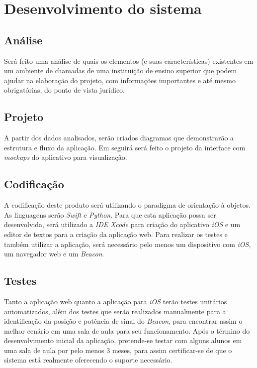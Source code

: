 \documentclass[
	12pt,
	oneside,
	a4paper,
	english,
	brazil,
]{abntex2}
\begin{document}
\section{Desenvolvimento do sistema}
\subsection{Análise}

Será feito uma análise de quais os elementos (e suas características) existentes em um ambiente de chamadas de uma instituição de ensino superior que podem ajudar na elaboração do projeto, com informações importantes e até mesmo obrigatórias, do ponto de vista jurídico.

\subsection{Projeto}

A partir dos dados analisados, serão criados diagramas que demonstrarão a estrutura e fluxo da aplicação. Em seguirá será feito o projeto da interface com \emph{mockups} do aplicativo para visualização.

\subsection{Codificação}

A codificação deste produto será utilizando o paradigma de orientação à objetos. As linguagens serão \emph{Swift} e \emph{Python}. Para que esta aplicação possa ser desenvolvida, será utilizado a \emph{IDE} \emph{Xcode} para criação do aplicativo \emph{iOS} e um editor de textos para a criação da aplicação web. Para realizar os testes e também utilizar a aplicação, será necessário pelo menos um dispositivo com \emph{iOS}, um navegador web e um \emph{Beacon}.

\subsection{Testes}

Tanto a aplicação web quanto a aplicação para \emph{iOS} terão testes unitários automatizados, além dos testes que serão realizados manualmente para a identificação da posição e potência de sinal do \emph{Beacon}, para encontrar assim o melhor cenário em uma sala de aula para seu funcionamento. Após o término do desenvolvimento inicial da aplicação, pretende-se testar com alguns alunos em uma sala de aula por pelo menos 3 meses, para assim certificar-se de que o sistema está realmente oferecendo o suporte necessário.
\end{document}
